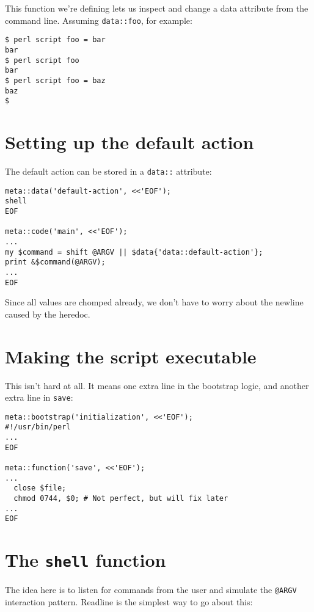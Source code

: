 \documentclass{report}
\begin{document}

    This function we're defining lets us inspect and change a data attribute from the command line. Assuming {\tt data::foo}, for example:

\begin{verbatim}
$ perl script foo = bar
bar
$ perl script foo
bar
$ perl script foo = baz
baz
$
\end{verbatim}

\section{Setting up the default action}\label{sec:adding-a-repl-setting-up-the-default-action}
    The default action can be stored in a {\tt data::} attribute:

\begin{verbatim}
meta::data('default-action', <<'EOF');
shell
EOF

meta::code('main', <<'EOF');
...
my $command = shift @ARGV || $data{'data::default-action'};
print &$command(@ARGV);
...
EOF
\end{verbatim}

    Since all values are chomped already, we don't have to worry about the newline caused by the heredoc.

\section{Making the script executable}\label{sec:adding-a-repl-making-the-script-executable}
    This isn't hard at all. It means one extra line in the bootstrap logic, and another extra line in {\tt save}:

\begin{verbatim}
meta::bootstrap('initialization', <<'EOF');
#!/usr/bin/perl
...
EOF

meta::function('save', <<'EOF');
...
  close $file;
  chmod 0744, $0; # Not perfect, but will fix later
...
EOF
\end{verbatim}

\section{The {\tt shell} function}\label{sec:adding-a-repl-the-shell-function}
    The idea here is to listen for commands from the user and simulate the \verb|@ARGV| interaction pattern. Readline is the simplest way to go about this:
\end{document}
